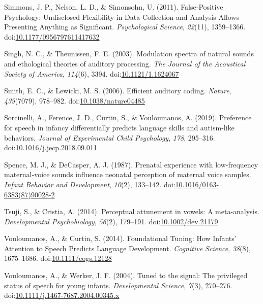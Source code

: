\documentclass[man]{apa6}
\begin{document}
\hypertarget{ref-simmons_false-positive_2011}{}
Simmons, J. P., Nelson, L. D., \& Simonsohn, U. (2011). False-Positive
Psychology: Undisclosed Flexibility in Data Collection and Analysis
Allows Presenting Anything as Significant. \emph{Psychological Science},
\emph{22}(11), 1359--1366.
doi:\href{https://doi.org/10.1177/0956797611417632}{10.1177/0956797611417632}

\hypertarget{ref-singh_modulation_2003}{}
Singh, N. C., \& Theunissen, F. E. (2003). Modulation spectra of natural
sounds and ethological theories of auditory processing. \emph{The
Journal of the Acoustical Society of America}, \emph{114}(6), 3394.
doi:\href{https://doi.org/10.1121/1.1624067}{10.1121/1.1624067}

\hypertarget{ref-smith_efficient_2006}{}
Smith, E. C., \& Lewicki, M. S. (2006). Efficient auditory coding.
\emph{Nature}, \emph{439}(7079), 978--982.
doi:\href{https://doi.org/10.1038/nature04485}{10.1038/nature04485}

\hypertarget{ref-sorcinelli_preference_2019}{}
Sorcinelli, A., Ference, J. D., Curtin, S., \& Vouloumanos, A. (2019).
Preference for speech in infancy differentially predicts language skills
and autism-like behaviors. \emph{Journal of Experimental Child
Psychology}, \emph{178}, 295--316.
doi:\href{https://doi.org/10.1016/j.jecp.2018.09.011}{10.1016/j.jecp.2018.09.011}

\hypertarget{ref-spence_prenatal_1987}{}
Spence, M. J., \& DeCasper, A. J. (1987). Prenatal experience with
low-frequency maternal-voice sounds influence neonatal perception of
maternal voice samples. \emph{Infant Behavior and Development},
\emph{10}(2), 133--142.
doi:\href{https://doi.org/10.1016/0163-6383(87)90028-2}{10.1016/0163-6383(87)90028-2}

\hypertarget{ref-tsuji_perceptual_2014}{}
Tsuji, S., \& Cristia, A. (2014). Perceptual attunement in vowels: A
meta-analysis. \emph{Developmental Psychobiology}, \emph{56}(2),
179--191.
doi:\href{https://doi.org/10.1002/dev.21179}{10.1002/dev.21179}

\hypertarget{ref-vouloumanos_foundational_2014}{}
Vouloumanos, A., \& Curtin, S. (2014). Foundational Tuning: How Infants'
Attention to Speech Predicts Language Development. \emph{Cognitive
Science}, \emph{38}(8), 1675--1686.
doi:\href{https://doi.org/10.1111/cogs.12128}{10.1111/cogs.12128}

\hypertarget{ref-vouloumanos_tuned_2004}{}
Vouloumanos, A., \& Werker, J. F. (2004). Tuned to the signal: The
privileged status of speech for young infants. \emph{Developmental
Science}, \emph{7}(3), 270--276.
doi:\href{https://doi.org/10.1111/j.1467-7687.2004.00345.x}{10.1111/j.1467-7687.2004.00345.x}
\end{document}

